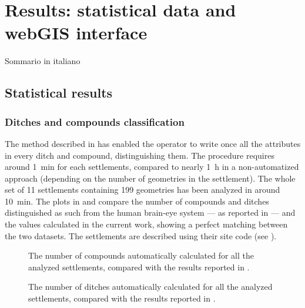 \chapter{Results: statistical data and webGIS interface}

    \vspace{0.06\textheight}
    \begin{chaptersum}
        Sommario in italiano
    \end{chaptersum}

    \section{Statistical results}
        \subsection{Ditches and compounds classification}
            The method described in  has enabled the operator to write once all the attributes in every ditch and compound, distinguishing them. The procedure requires around \SI{1}{\minute} for each settlements, compared to nearly \SI{1}{\hour} in a non-automatized approach (depending on the number of geometries in the settlement). The whole set of 11 settlements containing 199 geometries has been analyzed in around \SI{10}{\minute}. The plots in  and  compare the number of compounds and ditches distinguished as such from the human brain-eye system --- as reported in \cite{laterza} --- and the values calculated in the current work, showing a perfect matching between the two datasets. The settlements are described using their site code (see ).

            \begin{figure}[H]
                \centering
                \begin{tikzpicture}
                    
                \end{tikzpicture}
                \caption[The number of compounds in \cite{laterza} compared to the results of the proposed method.]{The number of compounds automatically calculated for all the analyzed settlements, compared with the results reported in \cite{laterza}.}
                \label{fig:graph-num-compound}
            \end{figure}

            \begin{figure}[H]
                \centering
                \begin{tikzpicture}
                    
                \end{tikzpicture}
                \caption[The number of ditches in \cite{laterza} compared to the results of the proposed method.]{The number of ditches automatically calculated for all the analyzed settlements, compared with the results reported in \cite{laterza}.}
                \label{fig:graph-num-ditch}
            \end{figure}

